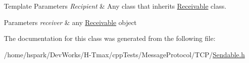 \begin{DoxyTemplParams}{Template Parameters}
{\em Recipient} & Any class that inherits \hyperlink{classReceivable}{Receivable} class. \\
\hline
\end{DoxyTemplParams}

\begin{DoxyParams}{Parameters}
{\em receiver} & any \hyperlink{classReceivable}{Receivable} object \\
\hline
\end{DoxyParams}


The documentation for this class was generated from the following file\-:\begin{DoxyCompactItemize}
\item 
/home/hspark/\-Dev\-Works/\-H-\/\-Tmax/cpp\-Tests/\-Message\-Protocol/\-T\-C\-P/\hyperlink{Sendable_8h}{Sendable.\-h}\end{DoxyCompactItemize}
